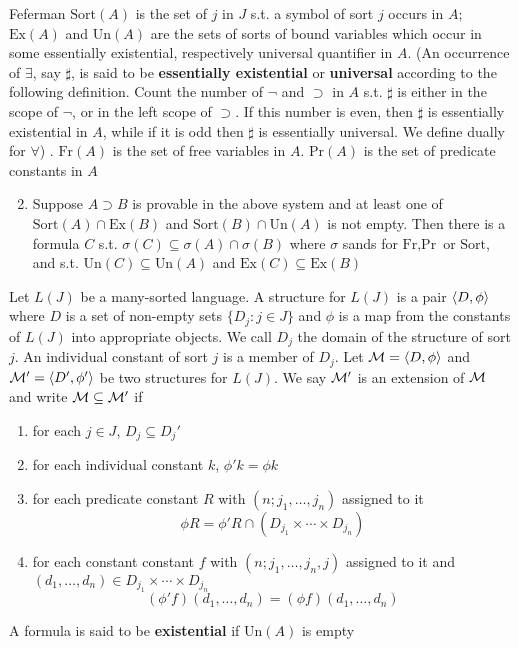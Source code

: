 \documentclass[11pt]{article}
\def \Sort {\text{Sort}}
\def \Ex {\text{Ex}}
\def \Un {\text{Un}}
\def \Fr {\text{Fr}}
\def \Pr {\text{Pr}}
\begin{document}
\begin{exercise}{Feferman}
\(\Sort(A)\) is the set  of \(j\) in \(J\) s.t. a symbol of sort \(j\) occurs
in \(A\); \(\Ex(A)\) and \(\Un(A)\) are the sets of sorts of bound variables which occur in some
essentially existential, respectively universal quantifier in \(A\). (An occurrence
of \(\exists\), say \(\sharp\), is said to be \textbf{essentially existential} or \textbf{universal} according to
the following definition. Count the number of \(\neg\) and \(\supset\) in \(A\) s.t. \(\sharp\)
is either in the scope of \(\neg\), or in the left scope of \(\supset\). If this number is even,
then \(\sharp\) is essentially existential in \(A\), while if it is odd then \(\sharp\) is
essentially universal. We define dually for \(\forall\)) . \(\Fr(A)\) is the set of free
variables in \(A\). \(\Pr(A)\) is the set of predicate constants in \(A\)

\begin{enumerate}
\setcounter{enumi}{1}
\item Suppose \(A\supset B\) is provable in the above system and at least one
of \(\Sort(A)\cap\Ex(B)\) and \(\Sort(B)\cap\Un(A)\) is not empty. Then there is a
formula \(C\) s.t. \(\sigma(C)\subseteq\sigma(A)\cap\sigma(B)\) where \(\sigma\) sands for \(\Fr,\Pr\)
or \(\Sort\), and s.t. \(\Un(C)\subseteq\Un(A)\) and \(\Ex(C)\subseteq\Ex(B)\)
\end{enumerate}
\end{exercise}

\begin{definition}[]
Let \(L(J)\) be a many-sorted language. A structure for \(L(J)\) is a pair \(\langle D,\phi\rangle\)
where \(D\) is a set of non-empty sets \(\{D_j:j\in J\}\) and \(\phi\) is a map from the constants
of \(L(J)\) into appropriate objects. We call \(D_j\) the domain of the structure of sort \(j\).
An individual constant of sort \(j\) is a member of \(D_j\). Let \(\mathcal{M}=\langle D,\phi\rangle\)
and \(\mathcal{M}'=\langle D',\phi'\rangle\) be two structures for \(L(J)\). We say \(\mathcal{M}'\) is an extension
of \(\mathcal{M}\) and write \(\mathcal{M}\subseteq\mathcal{M}'\) if
\begin{enumerate}
\item for each \(j\in J\), \(D_j\subseteq D_j'\)
\item for each individual constant \(k\), \(\phi'k=\phi k\)
\item for each predicate constant \(R\) with \((n;j_1,\dots,j_n)\) assigned to it
\begin{equation*}
\phi R=\phi'R\cap(D_{j_1}\times\cdots\times D_{j_n})
\end{equation*}
\item for each constant constant \(f\) with \((n;j_1,\dots,j_n,j)\) assigned to it and
\((d_1,\dots,d_n)\in D_{j_1}\times\cdots\times D_{j_n}\)
\begin{equation*}
(\phi' f)(d_1,\dots,d_n)=(\phi f)(d_1,\dots,d_n)
\end{equation*}
\end{enumerate}


A formula is said to be \textbf{existential} if \(\Un(A)\) is empty
\end{definition}
\end{document}
